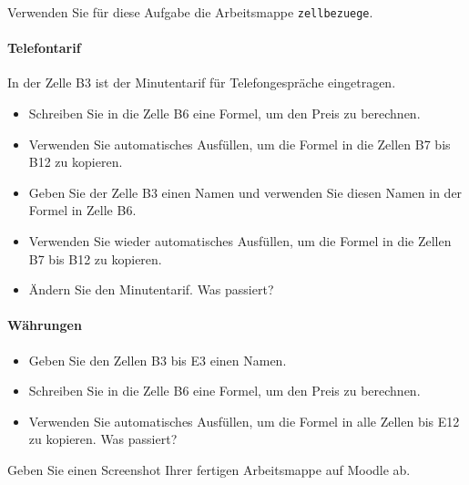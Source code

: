 \begin{mysubmission}[Zellbezüge]
    Verwenden Sie für diese Aufgabe die Arbeitsmappe \texttt{zellbezuege}.

    \paragraph*{Telefontarif}
    In der Zelle B3 ist der Minutentarif für Telefongespräche eingetragen.
    \begin{itemize}
        \item Schreiben Sie in die Zelle B6 eine Formel, um den Preis zu berechnen.
        \item Verwenden Sie automatisches Ausfüllen, um die Formel in die Zellen B7 bis B12 zu kopieren.
        \item Geben Sie der Zelle B3 einen Namen und verwenden Sie diesen Namen in der Formel in Zelle B6.
        \item Verwenden Sie wieder automatisches Ausfüllen, um die Formel in die Zellen B7 bis B12 zu kopieren.
        \item Ändern Sie den Minutentarif. Was passiert?
    \end{itemize}

    \paragraph*{Währungen}
    \begin{itemize}
        \item Geben Sie den Zellen B3 bis E3 einen Namen.
        \item Schreiben Sie in die Zelle B6 eine Formel, um den Preis zu berechnen.
        \item Verwenden Sie automatisches Ausfüllen, um die Formel in alle Zellen bis E12 zu kopieren. Was passiert?
    \end{itemize}
    Geben Sie einen Screenshot Ihrer fertigen Arbeitsmappe auf Moodle ab.
\end{mysubmission}

